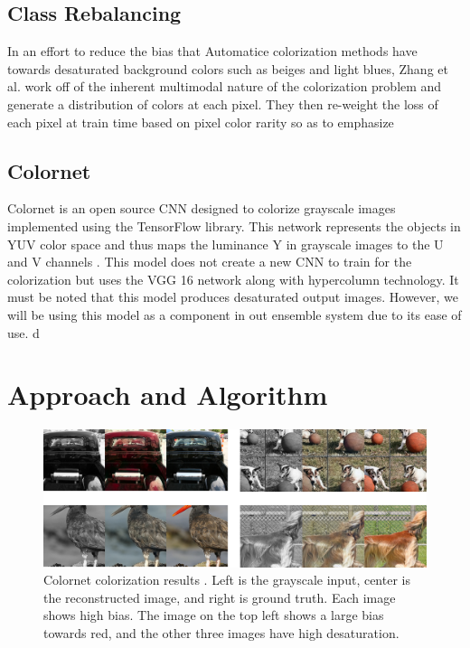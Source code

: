 \documentclass[10pt,twocolumn,letterpaper]{article}
\begin{document}
\subsection{Class Rebalancing}
In an effort to reduce the bias that Automatice colorization methods have towards desaturated background colors such as beiges and light blues, Zhang et al.\cite{Zhang2016} work off of the inherent multimodal nature of the colorization problem and generate a distribution of colors at each pixel. They then re-weight the loss of each pixel at train time based on pixel color rarity so as to emphasize

\subsection{Colornet}
Colornet is an open source CNN designed to colorize grayscale images implemented using the TensorFlow library\cite{ColorNet}. This network represents the objects in YUV color space and thus maps the luminance Y in grayscale images to the U and V channels \cite{YUVColorSpace}. This model does not create a new CNN to train for the colorization but uses the VGG 16\cite{VGG16}
network along with hypercolumn technology. It must be noted that this model produces desaturated output images. However, we will be using this model as a component in out ensemble system due to its ease of use.
d
\section{Approach and Algorithm}

\begin{figure}
  \centering
    \includegraphics[width=1\textwidth]{images/colornet}
  \caption{Colornet colorization results \cite{ColorNet}. Left is the grayscale input, center is the reconstructed image, and right is ground truth. Each image shows high bias. The image on the top left shows a large bias towards red, and the other three images have high desaturation.}
\end{figure}
\end{document}
